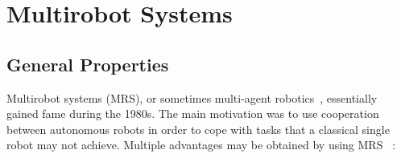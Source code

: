 \section{Multirobot Systems}
\label{sec:MRS}

  






  \subsection{General Properties} 

    Multirobot systems (MRS), or sometimes multi-agent robotics~\parencite{Dudek1996}, essentially gained fame during the 1980s. The main motivation was to use cooperation between autonomous robots in order to cope with tasks that a classical single robot may not achieve. Multiple advantages may be obtained by using MRS~\parencite{Cao1997, Arkin1998} :

